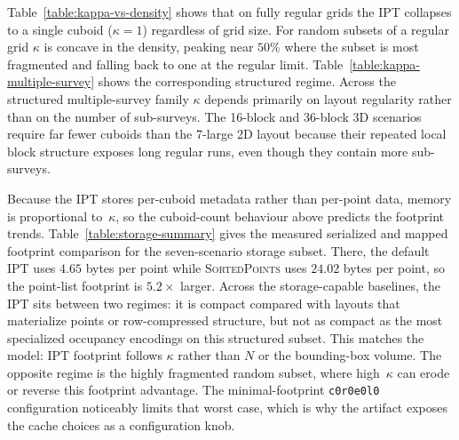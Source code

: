 \documentclass[manuscript,screen,review]{acmart}
\theoremstyle{definition}
\theoremstyle{plain}
\begin{document}
\begin{table}[ht]
\caption{Cuboid count for the structured multiple-survey scenarios
  used in the per-scenario comparison tables. The counts are
  platform-independent and use the same greedy-plus-merge constructor
  as Table~\ref{table:kappa-vs-density}. The normalized count
  $\kappa/N$ shows the metadata scale relative to the point count.}
\label{table:kappa-multiple-survey}

\end{table}

Table~\ref{table:kappa-vs-density} shows that on fully regular grids
the IPT collapses to a single cuboid ($\kappa = 1$) regardless of grid
size. For random subsets of a regular grid $\kappa$ is concave in the
density, peaking near $50\%$ where the subset is most fragmented and
falling back to one at the regular limit.
Table~\ref{table:kappa-multiple-survey} shows the corresponding
structured regime. Across the structured multiple-survey family
$\kappa$ depends primarily on layout regularity rather than on the
number of sub-surveys. The 16-block and 36-block 3D scenarios require
far fewer cuboids than the 7-large 2D layout because their repeated
local block structure exposes long regular runs, even though they
contain more sub-surveys.

Because the IPT stores per-cuboid metadata rather than per-point
data, memory is proportional to~$\kappa$, so the cuboid-count
behaviour above predicts the footprint trends.
Table~\ref{table:storage-summary} gives the measured serialized and
mapped footprint comparison for the seven-scenario storage subset.
There, the default IPT uses $4.65$ bytes per point while
\textsc{SortedPoints} uses $24.02$ bytes per point, so the point-list
footprint is $5.2\times$ larger. Across the storage-capable baselines,
the IPT sits between two regimes: it is compact compared with layouts
that materialize points or row-compressed structure, but not as compact
as the most specialized occupancy encodings on this structured subset.
This matches the model: IPT footprint follows $\kappa$ rather than $N$ or
the bounding-box volume. The opposite regime is the highly fragmented
random subset, where high~$\kappa$ can erode or reverse this footprint
advantage. The minimal-footprint \texttt{c0r0e0l0} configuration
noticeably limits that worst case, which is why the artifact exposes
the cache choices as a configuration knob.
\end{document}
